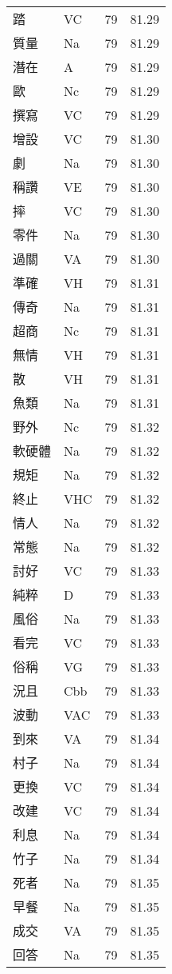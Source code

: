 \documentclass[twocolumn]{book}
\begin{document}
\begin{supertabular}{llrr}
踏 & VC & 79 &  81.29\\
質量 & Na & 79 &  81.29\\
潛在 & A & 79 &  81.29\\
歐 & Nc & 79 &  81.29\\
撰寫 & VC & 79 &  81.29\\
增設 & VC & 79 &  81.30\\
劇 & Na & 79 &  81.30\\
稱讚 & VE & 79 &  81.30\\
摔 & VC & 79 &  81.30\\
零件 & Na & 79 &  81.30\\
過關 & VA & 79 &  81.30\\
準確 & VH & 79 &  81.31\\
傳奇 & Na & 79 &  81.31\\
超商 & Nc & 79 &  81.31\\
無情 & VH & 79 &  81.31\\
散 & VH & 79 &  81.31\\
魚類 & Na & 79 &  81.31\\
野外 & Nc & 79 &  81.32\\
軟硬體 & Na & 79 &  81.32\\
規矩 & Na & 79 &  81.32\\
終止 & VHC & 79 &  81.32\\
情人 & Na & 79 &  81.32\\
常態 & Na & 79 &  81.32\\
討好 & VC & 79 &  81.33\\
純粹 & D & 79 &  81.33\\
風俗 & Na & 79 &  81.33\\
看完 & VC & 79 &  81.33\\
俗稱 & VG & 79 &  81.33\\
況且 & Cbb & 79 &  81.33\\
波動 & VAC & 79 &  81.33\\
到來 & VA & 79 &  81.34\\
村子 & Na & 79 &  81.34\\
更換 & VC & 79 &  81.34\\
改建 & VC & 79 &  81.34\\
利息 & Na & 79 &  81.34\\
竹子 & Na & 79 &  81.34\\
死者 & Na & 79 &  81.35\\
早餐 & Na & 79 &  81.35\\
成交 & VA & 79 &  81.35\\
回答 & Na & 79 &  81.35\\

\end{supertabular}
\end{document}
